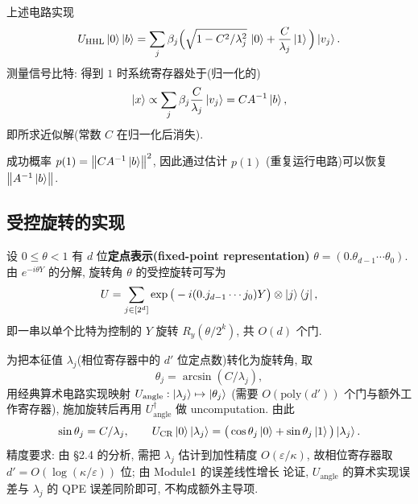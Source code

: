 \documentclass[utf8]{article} %
\numberwithin{equation}{section}   %
\newtheorem{Thm}{\hskip 2em {\color{blue} 定理}}[subsection]
\newtheorem{Prop}{\hskip 2em {\color{cyan} 命题}}[subsection]
\newtheorem{Note}{\hskip 2em {\color{red} 注}}[subsection]
\begin{document}
\begin{Thm}
    上述电路实现
    \begin{equation}
        U_{\mathrm{HHL}} \ket{0}\ket{b}
        = \sum_j \beta_j \Big(\sqrt{1 - C^2/\lambda_j^2}\,\ket{0}
        + \frac{C}{\lambda_j}\ket{1}\Big)\ket{v_j}.
    \end{equation}
    测量信号比特: 得到 $1$ 时系统寄存器处于(归一化的)
    \begin{equation}
        \ket{x} \propto \sum_j \beta_j \frac{C}{\lambda_j}\ket{v_j} = C A^{-1}\ket{b},
    \end{equation}
    即所求近似解(常数 $C$ 在归一化后消失).
\end{Thm}

\begin{Note}[恢复解的范数]
    成功概率 $p(1) = \norm{C A^{-1}\ket{b}}^2$, 因此通过估计 $p(1)$
    (重复运行电路)可以恢复 $\norm{A^{-1}\ket{b}}$.
\end{Note}

\subsection{受控旋转的实现} \label{subsec:hhl-cr}

\begin{Prop}[按旋转角的受控旋转]
    设 $0 \le \theta < 1$ 有 $d$ 位\textbf{定点表示(fixed-point representation)} $\theta = (0.\theta_{d-1}\cdots\theta_0)$.
    由 $e^{-i\theta Y}$ 的分解, 旋转角 $\theta$ 的受控旋转可写为
    \begin{equation}
        U = \sum_{j \in [2^d]} \exp\big(-i (0.j_{d-1}\cdots j_0) Y\big) \otimes \ket{j}\bra{j},
    \end{equation}
    即一串以单个比特为控制的 $Y$ 旋转 $R_y(\theta/2^{k})$, 共 $O(d)$ 个门.
\end{Prop}

\begin{Note}
    为把本征值 $\lambda_j$(相位寄存器中的 $d'$ 位定点数)转化为旋转角, 取
    \begin{equation}
        \theta_j = \arcsin(C/\lambda_j),
    \end{equation}
    用经典算术电路实现映射 $U_{\mathrm{angle}}: \ket{\lambda_j} \mapsto \ket{\theta_j}$
    (需要 $O(\mathrm{poly}(d'))$ 个门与额外工作寄存器), 施加旋转后再用
    $U_{\mathrm{angle}}^\dagger$ 做 uncomputation. 由此
    \[ \sin\theta_j = C/\lambda_j, \qquad
       U_{\mathrm{CR}}\ket{0}\ket{\lambda_j}
       = \big(\cos\theta_j\ket{0} + \sin\theta_j\ket{1}\big)\ket{\lambda_j}. \]
    精度要求: 由 §2.4 的分析, 需把 $\lambda_j$ 估计到加性精度 $O(\varepsilon/\kappa)$,
    故相位寄存器取 $d' = O(\log(\kappa/\varepsilon))$ 位; 由 Module1 的误差线性增长
    论证, $U_{\mathrm{angle}}$ 的算术实现误差与 $\lambda_j$ 的 QPE 误差同阶即可,
    不构成额外主导项.
\end{Note}
\end{document}
